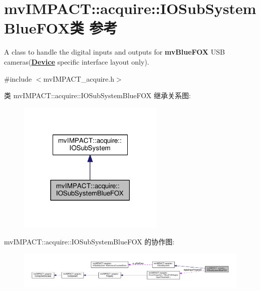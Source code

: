 \hypertarget{classmv_i_m_p_a_c_t_1_1acquire_1_1_i_o_sub_system_blue_f_o_x}{\section{mv\+I\+M\+P\+A\+C\+T\+:\+:acquire\+:\+:I\+O\+Sub\+System\+Blue\+F\+O\+X类 参考}
\label{classmv_i_m_p_a_c_t_1_1acquire_1_1_i_o_sub_system_blue_f_o_x}
}


A class to handle the digital inputs and outputs for {\bfseries mv\+Blue\+F\+O\+X} U\+S\+B cameras({\bfseries \hyperlink{classmv_i_m_p_a_c_t_1_1acquire_1_1_device}{Device}} specific interface layout only).  




{\ttfamily \#include $<$mv\+I\+M\+P\+A\+C\+T\+\_\+acquire.\+h$>$}



类 mv\+I\+M\+P\+A\+C\+T\+:\+:acquire\+:\+:I\+O\+Sub\+System\+Blue\+F\+O\+X 继承关系图\+:
\nopagebreak
\begin{figure}[H]
\begin{center}
\leavevmode
\includegraphics[width=198pt]{classmv_i_m_p_a_c_t_1_1acquire_1_1_i_o_sub_system_blue_f_o_x__inherit__graph}
\end{center}
\end{figure}


mv\+I\+M\+P\+A\+C\+T\+:\+:acquire\+:\+:I\+O\+Sub\+System\+Blue\+F\+O\+X 的协作图\+:
\nopagebreak
\begin{figure}[H]
\begin{center}
\leavevmode
\includegraphics[width=350pt]{classmv_i_m_p_a_c_t_1_1acquire_1_1_i_o_sub_system_blue_f_o_x__coll__graph}
\end{center}
\end{figure}
